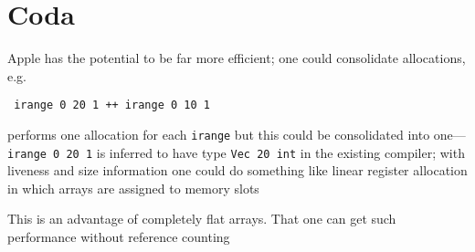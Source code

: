 \documentclass[sigplan,screen]{acmart}
\begin{document}
\section{Coda}

Apple has the potential to be far more efficient; one could consolidate allocations, e.g.

\begin{verbatim}
 irange 0 20 1 ++ irange 0 10 1
\end{verbatim}
performs one allocation for each {\tt irange} but this could be consolidated into one---{\tt irange 0 20 1} is inferred to have type {\tt Vec 20 int} in the existing compiler; with liveness and size information one could do something like linear register allocation in which arrays are assigned to memory slots

This is an advantage of completely flat arrays. That one can get such performance without reference counting




\end{document}
